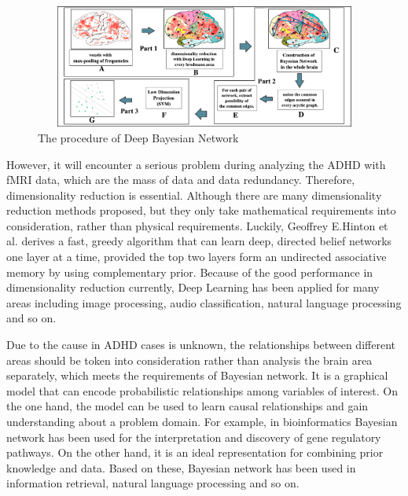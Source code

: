\documentclass{article}
\begin{document}
\begin{figure}[ht]
\begin{center}
   \includegraphics[width=460pt, height=115pt]{Figures/overviews.eps}
\end{center}
   \caption{The procedure of Deep Bayesian Network}
\label{fig:overview}
\end{figure}


However, it will encounter a serious problem during analyzing the ADHD with fMRI data, which are the mass of data and data redundancy. Therefore, dimensionality reduction is essential. Although there are many dimensionality reduction methods proposed, but they only take mathematical requirements into consideration, rather than physical requirements. Luckily, Geoffrey E.Hinton et al.\cite{8} derives a fast, greedy algorithm that can learn deep, directed belief networks one layer at a time, provided the top two layers form an undirected associative memory by using complementary prior.  Because of the good performance in dimensionality reduction currently, Deep Learning has been applied for many areas including image processing\cite{8}, audio classification\cite{9}, natural language processing\cite{12} and so on.


Due to the cause in ADHD cases is unknown, the relationships between different areas should be token into consideration rather than analysis the brain area separately, which meets the requirements of Bayesian network. It is a graphical model that can encode probabilistic relationships among variables of interest. On the one hand, the model can be used to learn causal relationships and gain understanding about a problem domain. For example, in bioinformatics Bayesian network has been used for the interpretation and discovery of gene regulatory pathways\cite{14}. On the other hand, it is an ideal representation for combining prior knowledge and data. Based on these, Bayesian network has been used in information retrieval\cite{15}, natural language processing\cite{16} and so on.
\end{document}
